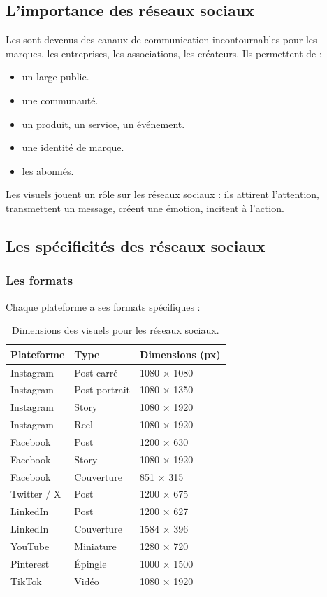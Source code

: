 \subsection{L'importance des réseaux sociaux}

Les  sont devenus des canaux de communication incontournables pour les marques, les entreprises, les associations, les créateurs. Ils permettent de :

\begin{itemize}
    \item {} un large public.
    \item {} une communauté.
    \item {} un produit, un service, un événement.
    \item {} une identité de marque.
    \item {} les abonnés.
\end{itemize}

Les visuels jouent un rôle  sur les réseaux sociaux : ils attirent l'attention, transmettent un message, créent une émotion, incitent à l'action.

\subsection{Les spécificités des réseaux sociaux}

\subsubsection{Les formats}

Chaque plateforme a ses formats spécifiques :

\begin{table}[h!]
\centering
\begin{tabular}{@{}p{3cm}p{4cm}p{6cm}@{}}
\toprule
\textbf{Plateforme} & \textbf{Type} & \textbf{Dimensions (px)} \\
\midrule
Instagram & Post carré & 1080 × 1080 \\
Instagram & Post portrait & 1080 × 1350 \\
Instagram & Story & 1080 × 1920 \\
Instagram & Reel & 1080 × 1920 \\
Facebook & Post & 1200 × 630 \\
Facebook & Story & 1080 × 1920 \\
Facebook & Couverture & 851 × 315 \\
Twitter / X & Post & 1200 × 675 \\
LinkedIn & Post & 1200 × 627 \\
LinkedIn & Couverture & 1584 × 396 \\
YouTube & Miniature & 1280 × 720 \\
Pinterest & Épingle & 1000 × 1500 \\
TikTok & Vidéo & 1080 × 1920 \\
\bottomrule
\end{tabular}
\caption{Dimensions des visuels pour les réseaux sociaux.}
\end{table}

